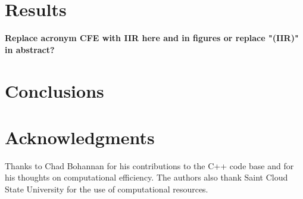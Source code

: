 \documentclass[preprint,12pt]{elsarticle}
\begin{document}

\section{Results}\label{sec:bode}
{\bf Replace acronym CFE with IIR here and in figures or replace "(IIR)" in abstract?}




\section{Conclusions}\label{conclusions}
%





\section*{Acknowledgments}

Thanks to Chad Bohannan for his contributions to the C++ code base and
for his thoughts on computational efficiency. The authors also thank
Saint Cloud State University for the use of computational resources.














\end{document}
